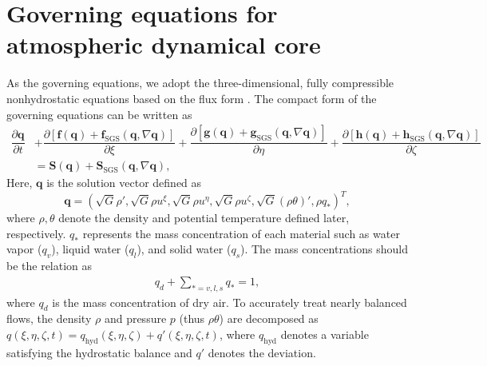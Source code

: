 \section{Governing equations for atmospheric dynamical core}
As the governing equations, 
we adopt the three-dimensional, 
fully compressible nonhydrostatic equations based on the flux form \citep [e.g.,][]{ullrich2012dynamical}. 
The compact form of the governing equations 
can be written as
\begin{align}
    \dfrac{\partial \bm{q}}{\partial t} 
    &+ \dfrac{\partial \left[\bm{f}(\bm{q})+\bm{f}_\textrm{SGS}(\bm{q},\nabla \bm{q}) \right]}{\partial \xi} 
    + \dfrac{\partial \left[\bm{g}(\bm{q})+\bm{g}_\textrm{SGS}(\bm{q},\nabla \bm{q}) \right]}{\partial \eta} 
    + \dfrac{\partial \left[\bm{h}(\bm{q})+\bm{h}_\textrm{SGS}(\bm{q},\nabla \bm{q}) \right]}{\partial \zeta} \nonumber \\
    &= \bm{S}(\bm{q}) 
    + \bm{S}_\textrm{SGS}(\bm{q},\nabla \bm{q}),
\label{eq:GovernEq_NonhydrostaticDynCore}
\end{align}
Here, 
$\bm{q}$ is the solution vector defined as
\begin{equation}
  \bm{q} 
  = \left( \sqrt{G} \rho', \sqrt{G} \rho u^\xi, \sqrt{G} \rho u^\eta, \sqrt{G} \rho u^\zeta, \sqrt{G} (\rho \theta)', \rho q_{*} \right)^T,  
\label{eq:solution_vector}
\end{equation}
where 
$\rho, \theta$ denote the density and potential temperature defined later, respectively. 
$q_*$ represents the mass concentration of each material such as 
water vapor ($q_v$), liquid water ($q_l$), and solid water ($q_s$). 
The mass concentrations should be the relation as 
\begin{align}
   q_d + \sum_{*=v,l,s} q_* = 1, 
\end{align}
where $q_d$ is the mass concentration of dry air. 
To accurately treat nearly balanced flows, 
the density $\rho$ and pressure $p$ (thus $\rho \theta$) are decomposed 
as $q(\xi,\eta,\zeta,t) = q_\textrm{hyd}(\xi,\eta,\zeta) + q'(\xi,\eta,\zeta,t)$,  
where $q_\textrm{hyd}$ denotes a variable satisfying the hydrostatic balance and $q'$ denotes the deviation. 


